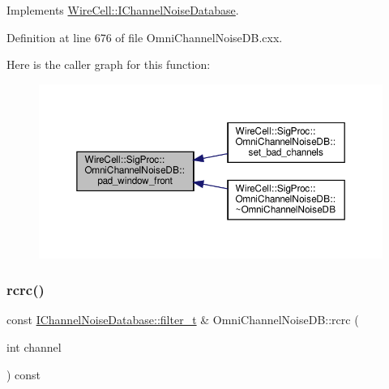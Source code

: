 Implements \hyperlink{class_wire_cell_1_1_i_channel_noise_database_a77f82280942595e1a2506f49a6f76f56}{Wire\+Cell\+::\+I\+Channel\+Noise\+Database}.



Definition at line 676 of file Omni\+Channel\+Noise\+D\+B.\+cxx.

Here is the caller graph for this function\+:
\nopagebreak
\begin{figure}[H]
\begin{center}
\leavevmode
\includegraphics[width=350pt]{class_wire_cell_1_1_sig_proc_1_1_omni_channel_noise_d_b_afc69ca596a5ff6f8a63fc64234c8062e_icgraph}
\end{center}
\end{figure}
\mbox{\label{class_wire_cell_1_1_sig_proc_1_1_omni_channel_noise_d_b_a0155aba843a5a04966ffcfe556b207f8}} 
\subsubsection{\texorpdfstring{rcrc()}{rcrc()}}
{\footnotesize\ttfamily const \hyperlink{class_wire_cell_1_1_i_channel_noise_database_a0acbae29743542eb1c652f7a56e692f5}{I\+Channel\+Noise\+Database\+::filter\+\_\+t} \& Omni\+Channel\+Noise\+D\+B\+::rcrc (\begin{DoxyParamCaption}\item[{int}]{channel }\end{DoxyParamCaption}) const\hspace{0.3cm}{\ttfamily [virtual]}}



